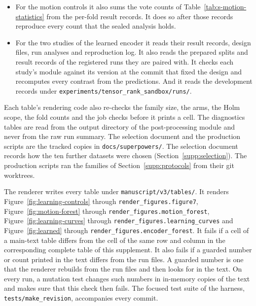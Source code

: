 {\begin{itemize}[leftmargin=2em,topsep=2pt,itemsep=1pt]
\item For the motion controls it also sums the vote counts of Table~\ref{tab:s-motion-statistics} from the per-fold result records. It does so after those records reproduce every count that the sealed analysis holds.
\item For the two studies of the learned encoder it reads their result records, design files, run analyses and reproduction log. It also reads the prepared splits and result records of the registered runs they are paired with. It checks each study's module against its version at the commit that fixed the design and recomputes every contrast from the predictions. And it reads the development records under \texttt{experiments/tensor\_rank\_sandbox/runs/}.
\end{itemize}

Each table's rendering code also re-checks the family size, the arms, the Holm scope, the fold counts and the job checks before it prints a cell. The diagnostics tables are read from the output directory of the post-processing module and never from the raw run summary. The selection document and the production scripts are the tracked copies in \texttt{docs/superpowers/}. The selection document records how the ten further datasets were chosen (Section~\ref{supp:selection}). The production scripts ran the families of Section~\ref{supp:protocols} from their git worktrees.

The renderer writes every table under \texttt{manuscript/v3/tables/}. It renders Figure~\ref{fig:learning-controls} through \texttt{render\_figures.figure7}, Figure~\ref{fig:motion-forest} through \texttt{render\_figures.motion\_forest}, Figure~\ref{fig:learning-curves} through \texttt{render\_figures.learning\_curves} and Figure~\ref{fig:learned} through \texttt{render\_figures.encoder\_forest}. It fails if a cell of a main-text table differs from the cell of the same row and column in the corresponding complete table of this supplement. It also fails if a guarded number or count printed in the text differs from the run files. A guarded number is one that the renderer rebuilds from the run files and then looks for in the text. On every run, a mutation test changes such numbers in in-memory copies of the text and makes sure that this check then fails. The focused test suite of the harness, \texttt{tests/make\_revision}, accompanies every commit.

}
